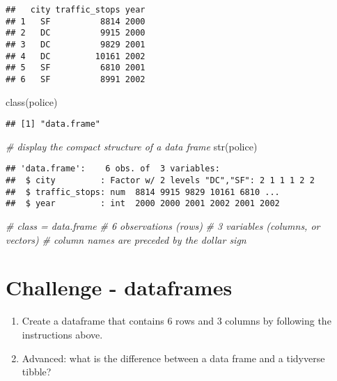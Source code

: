 \documentclass[
]{article}
\newenvironment{Shaded}{\begin{snugshade}}{\end{snugshade}}
\newcommand{\CommentTok}[1]{\textcolor[rgb]{0.56,0.35,0.01}{\textit{#1}}}
\newcommand{\FunctionTok}[1]{\textcolor[rgb]{0.00,0.00,0.00}{#1}}
\newcommand{\NormalTok}[1]{#1}
\begin{document}
\begin{verbatim}
##   city traffic_stops year
## 1   SF          8814 2000
## 2   DC          9915 2000
## 3   DC          9829 2001
## 4   DC         10161 2002
## 5   SF          6810 2001
## 6   SF          8991 2002
\end{verbatim}

\begin{Shaded}
\begin{Highlighting}[]
\FunctionTok{class}\NormalTok{(police)}
\end{Highlighting}
\end{Shaded}

\begin{verbatim}
## [1] "data.frame"
\end{verbatim}

\begin{Shaded}
\begin{Highlighting}[]
\CommentTok{\# display the compact structure of a data frame}
\FunctionTok{str}\NormalTok{(police)}
\end{Highlighting}
\end{Shaded}

\begin{verbatim}
## 'data.frame':    6 obs. of  3 variables:
##  $ city         : Factor w/ 2 levels "DC","SF": 2 1 1 1 2 2
##  $ traffic_stops: num  8814 9915 9829 10161 6810 ...
##  $ year         : int  2000 2000 2001 2002 2001 2002
\end{verbatim}

\begin{Shaded}
\begin{Highlighting}[]
\CommentTok{\# class = data.frame}
\CommentTok{\# 6 observations (rows)}
\CommentTok{\# 3 variables (columns, or vectors)}
\CommentTok{\# column names are preceded by the dollar sign }
\end{Highlighting}
\end{Shaded}

\hypertarget{challenge---dataframes}{%
\section{Challenge - dataframes}\label{challenge---dataframes}}

\begin{enumerate}
\def\labelenumi{\arabic{enumi}.}
\item
  Create a dataframe that contains 6 rows and 3 columns by following the
  instructions above.
\item
  Advanced: what is the difference between a data frame and a tidyverse
  tibble?
\end{enumerate}
\end{document}
